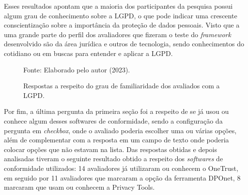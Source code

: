 \documentclass[
	12pt,				%
	openright,			%
	oneside,			%
	a4paper,			%
	english,			%
	french,				%
	spanish,			%
	brazil,				%
	]{abntex2}
\begin{document}
Esses resultados apontam que a maioria dos participantes da pesquisa possui algum grau de conhecimento sobre a LGPD, o que pode indicar uma crescente conscientização sobre a importância da proteção de dados pessoais. Visto que a uma grande parte do perfil dos avaliadores que fizeram o teste do \textit{framework} desenvolvido são da área jurídica e outros de tecnologia, sendo conhecimentos do cotidiano ou em buscas para entender e aplicar a LGPD. 


\begin{figure}[ht]
    \centering
    \caption{Respostas a respeito do grau de familiaridade dos avaliados com a LGPD.}
    \label{fig: grafico5}
    
    \centering \small Fonte: Elaborado pelo autor (2023).
\end{figure}


Por fim, a última pergunta da primeira seção foi a respeito de se já usou ou conhece algum desses softwares de conformidade, sendo a configuração da pergunta em \textit{checkbox}, onde o avaliado poderia escolher uma ou várias opções, além de complementar com a resposta em um campo de texto onde poderia colocar opções que não estavam na lista.
Das respostas obtidas e depois analisadas tiveram o seguinte resultado obtido a respeito dos \textit{softwares} de conformidade utilizados: 14 avaliadores já utilizaram ou conhecem o OneTrust, em seguido por 11 avaliadores que marcaram a opção da ferramenta DPOnet, 8 marcaram que usam ou conhecem a Privacy Tools. 
\end{document}
